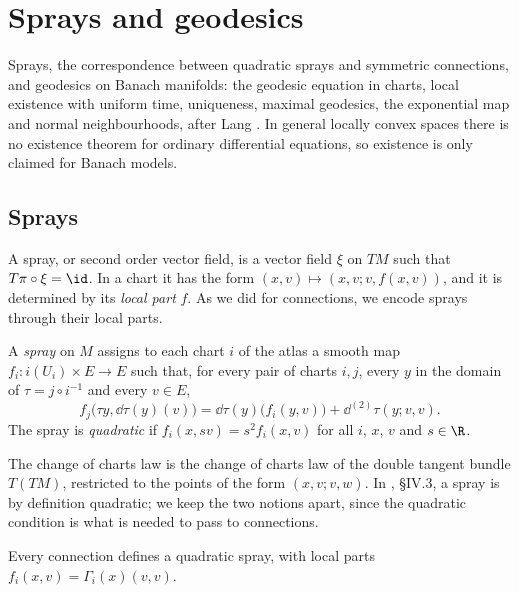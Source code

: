 \chapter{Sprays and geodesics}
\label{chap:geodesics}

Sprays, the correspondence between quadratic sprays and symmetric connections, and geodesics on
Banach manifolds: the geodesic equation in charts, local existence with uniform time, uniqueness,
maximal geodesics, the exponential map and normal neighbourhoods, after Lang
\cite[\S\S IV.3--4, VIII.5]{Lan99}. In general locally convex spaces there is no existence theorem
for ordinary differential equations, so existence is only claimed for Banach models.

\section{Sprays}

A spray, or second order vector field, is a vector field $\xi$ on $TM$ such that
$T\pi \circ \xi = \id$. In a chart it has the form $(x, v) \mapsto (x, v; v, f(x, v))$, and it is
determined by its \emph{local part} $f$. As we did for connections, we encode sprays through their
local parts.

\begin{definition}[Spray]
  \label{def:spray}
  \leanok
  A \emph{spray} on $M$ assigns to each chart $i$ of the atlas a smooth map
  $f_i \colon i(U_i) \times E \to E$ such that, for every pair of charts $i, j$, every $y$ in the
  domain of $\tau = j \circ i^{-1}$ and every $v \in E$,
  \[
    f_j\bigl(\tau y, \dd\tau(y)(v)\bigr) = \dd\tau(y)\bigl(f_i(y, v)\bigr) + \dd^{(2)}\tau(y; v, v).
  \]
  The spray is \emph{quadratic} if $f_i(x, s v) = s^2 f_i(x, v)$ for all $i$, $x$, $v$ and
  $s \in \R$.
\end{definition}

The change of charts law is the change of charts law of the double tangent bundle $T(TM)$,
restricted to the points of the form $(x, v; v, w)$. In \cite{Lan99}, \S IV.3, a spray is by
definition quadratic; we keep the two notions apart, since the quadratic condition is what is
needed to pass to connections.

\begin{proposition}
  \label{prop:conn-to-spray}
  \leanok
  Every connection defines a quadratic spray, with local parts $f_i(x, v) = \Gamma_i(x)(v, v)$.
\end{proposition}

